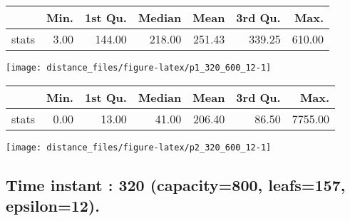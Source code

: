 \documentclass[
  9pt,
  landscape]{article}
\begin{document}
\begin{minipage}{0.5\textwidth} 
\centering 
\begin{tabular}{rrrrrrr}
  \hline
 & Min. & 1st Qu. & Median & Mean & 3rd Qu. & Max. \\ 
  \hline
stats & 3.00 & 144.00 & 218.00 & 251.43 & 339.25 & 610.00 \\ 
   \hline
\end{tabular}
\vspace{0.5cm} 


\texttt{[image: distance\_files/figure-latex/p1\_320\_600\_12-1]} 

\end{minipage} 
\begin{minipage}{0.5\textwidth} 
\centering 
\begin{tabular}{rrrrrrr}
  \hline
 & Min. & 1st Qu. & Median & Mean & 3rd Qu. & Max. \\ 
  \hline
stats & 0.00 & 13.00 & 41.00 & 206.40 & 86.50 & 7755.00 \\ 
   \hline
\end{tabular}
\vspace{0.5cm} 


\texttt{[image: distance\_files/figure-latex/p2\_320\_600\_12-1]} 

\end{minipage}

\pagebreak

\hypertarget{time-instant-320-capacity800-leafs157-epsilon12.}{%
\subsection{Time instant : 320 (capacity=800, leafs=157,
epsilon=12).}\label{time-instant-320-capacity800-leafs157-epsilon12.}}
\end{document}
